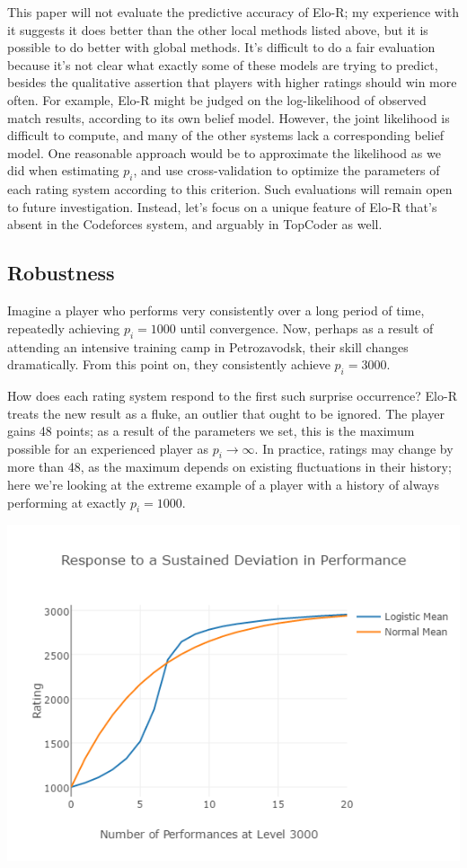 \documentclass{article}
\begin{document}
This paper will not evaluate the predictive accuracy of Elo-R; my experience with it suggests it does better than the other local methods listed above, but it is possible to do better with global methods. It's difficult to do a fair evaluation because it's not clear what exactly some of these models are trying to predict, besides the qualitative assertion that players with higher ratings should win more often. For example, Elo-R might be judged on the log-likelihood of observed match results, according to its own belief model. However, the joint likelihood is difficult to compute, and many of the other systems lack a corresponding belief model. One reasonable approach would be to approximate the likelihood as we did when estimating $p_i$, and use cross-validation to optimize the parameters of each rating system according to this criterion. Such evaluations will remain open to future investigation. Instead, let's focus on a unique feature of Elo-R that's absent in the Codeforces system, and arguably in TopCoder as well.

\subsection{Robustness}

Imagine a player who performs very consistently over a long period of time, repeatedly achieving $p_i = 1000$ until convergence. Now, perhaps as a result of attending an intensive training camp in Petrozavodsk, their skill changes dramatically. From this point on, they consistently achieve $p_i = 3000$.

How does each rating system respond to the first such surprise occurrence? Elo-R treats the new result as a fluke, an outlier that ought to be ignored. The player gains 48 points; as a result of the parameters we set, this is the maximum possible for an experienced player as $p_i \rightarrow \infty$. In practice, ratings may change by more than 48, as the maximum depends on existing fluctuations in their history; here we're looking at the extreme example of a player with a history of always performing at exactly $p_i = 1000$.

\begin{center} \includegraphics[scale=0.5]{../images/ResponsePlot.png} \end{center}
\end{document}
